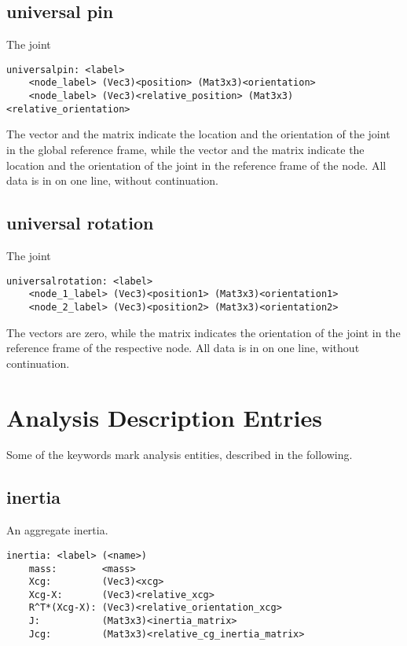 \subsection{universal pin}
The  joint
\begin{verbatim}
universalpin: <label>
    <node_label> (Vec3)<position> (Mat3x3)<orientation>
    <node_label> (Vec3)<relative_position> (Mat3x3)<relative_orientation>
\end{verbatim}
The  vector and the  matrix indicate 
the location and the orientation of the joint in the global reference frame, 
while the  vector
and the  matrix indicate
the location and the orientation of the joint
in the reference frame of the node.
All data is in on one line, without continuation.

\subsection{universal rotation}
The  joint
\begin{verbatim}
universalrotation: <label>
    <node_1_label> (Vec3)<position1> (Mat3x3)<orientation1>
    <node_2_label> (Vec3)<position2> (Mat3x3)<orientation2>
\end{verbatim}
The  vectors are zero,
while the matrix  indicates the orientation of the joint
in the reference frame of the respective node.
All data is in on one line, without continuation.


\section{Analysis Description Entries}
Some of the keywords mark analysis entities, described in the following.

\subsection{inertia}
An aggregate inertia.
\begin{verbatim}
inertia: <label> (<name>)
    mass:        <mass>
    Xcg:         (Vec3)<xcg>
    Xcg-X:       (Vec3)<relative_xcg>
    R^T*(Xcg-X): (Vec3)<relative_orientation_xcg>
    J:           (Mat3x3)<inertia_matrix>
    Jcg:         (Mat3x3)<relative_cg_inertia_matrix>
\end{verbatim}

